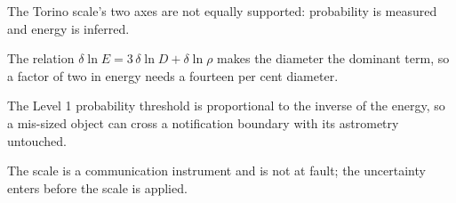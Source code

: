 \begin{keytakeaways}
\item The Torino scale's two axes are not equally supported: probability is
measured and energy is inferred.
\item The relation \(\delta\ln E = 3\,\delta\ln D + \delta\ln \rho\) makes
the diameter the dominant term, so a factor of two in energy needs a
fourteen per cent diameter.
\item The Level 1 probability threshold is proportional to the inverse of the
energy, so a mis-sized object can cross a notification boundary with its
astrometry untouched.
\item The scale is a communication instrument and is not at fault; the
uncertainty enters before the scale is applied.
\end{keytakeaways}
